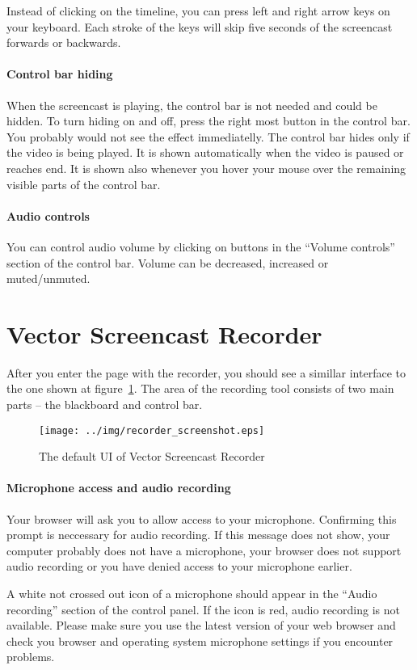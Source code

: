 Instead of clicking on the timeline, you can press left and right arrow keys on your keyboard. Each stroke of the keys will skip five seconds of the screencast forwards or backwards.

\paragraph{Control bar hiding}
When the screencast is playing, the control bar is not needed and could be hidden. To turn hiding on and off, press the right most button in the control bar. You probably would not see the effect immediatelly. The control bar hides only if the video is being played. It is shown automatically when the video is paused or reaches end. It is shown also whenever you hover your mouse over the remaining visible parts of the control bar.

\paragraph{Audio controls}
You can control audio volume by clicking on buttons in the ``Volume controls'' section of the control bar. Volume can be decreased, increased or muted/unmuted.


\section{Vector Screencast Recorder}
After you enter the page with the recorder, you should see a simillar interface to the one shown at figure~\ref{fig:recorder}. The area of the recording tool consists of two main parts -- the blackboard and control bar.

\begin{figure}
	\centering
		\texttt{[image: ../img/recorder\_screenshot.eps]}
		\label{fig:recorder}
		\caption{The default UI of Vector Screencast Recorder}
\end{figure}

\paragraph{Microphone access and audio recording}
Your browser will ask you to allow access to your microphone. Confirming this prompt is neccessary for audio recording. If this message does not show, your computer probably does not have a microphone, your browser does not support audio recording or you have denied access to your microphone earlier. 

A white not crossed out icon of a microphone should appear in the ``Audio recording'' section of the control panel. If the icon is red, audio recording is not available. Please make sure you use the latest version of your web browser and check you browser and operating system microphone settings if you encounter problems.

